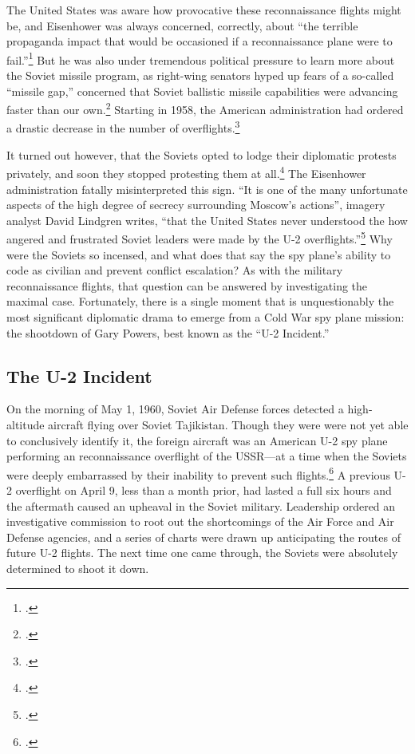 \documentclass[12pt]{article}
\begin{document}
The United States was aware how provocative these reconnaissance flights might be, and Eisenhower was always concerned, correctly, about ``the terrible propaganda impact that would be occasioned if a reconnaissance plane were to fail.''\footcite[p.~162]{pedlow_cia_1998} But he was also under tremendous political pressure to learn more about the Soviet missile program, as right-wing senators hyped up fears of a so-called ``missile gap,'' concerned that Soviet ballistic missile capabilities were advancing faster than our own.\footcite[Fears of this missile gap quickly followed earlier fears of a ``bomber gap,'' which ironically the U-2 had been critical in disproving.]{licklider_missile_1970} Starting in 1958, the American administration had ordered a drastic decrease in the number of overflights.\footcite[p.~51]{powers_operation_2004}

It turned out however, that the Soviets opted to lodge their diplomatic protests privately, and soon they stopped protesting them at all.\footcite[p.~42]{lindgren_trust_2000} The Eisenhower administration fatally misinterpreted this sign. ``It is one of the many unfortunate aspects of the high degree of secrecy surrounding Moscow's actions'', imagery analyst David Lindgren writes, ``that the United States never understood the how angered and frustrated Soviet leaders were made by the U-2 overflights.''\footcite[p.~52]{lindgren_trust_2000} Why were the Soviets so incensed, and what does that say the spy plane's ability to code as civilian and prevent conflict escalation? As with the military reconnaissance flights, that question can be answered by investigating the maximal case. Fortunately, there is a single moment that is unquestionably the most significant diplomatic drama to emerge from a Cold War spy plane mission: the shootdown of Gary Powers, best known as the ``U-2 Incident.''

\subsection{The U-2 Incident}
On the morning of May 1, 1960, Soviet Air Defense forces detected a high-altitude aircraft flying over Soviet Tajikistan. Though they were were not yet able to conclusively identify it, the foreign aircraft was an American U-2 spy plane performing an reconnaissance overflight of the USSR---at a time when the Soviets were deeply embarrassed by their inability to prevent such flights.\footcite{orlov_u-2_2007} A previous U-2 overflight on April 9, less than a month prior, had lasted a full six hours and the aftermath caused an upheaval in the Soviet military. Leadership ordered an investigative commission to root out the shortcomings of the Air Force and Air Defense agencies, and a series of charts were drawn up anticipating the routes of future U-2 flights. The next time one came through, the Soviets were absolutely determined to shoot it down.
\end{document}
